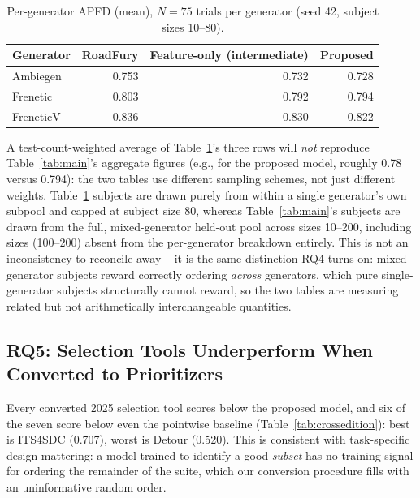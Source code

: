 \documentclass[smallextended]{svjour3}
\begin{document}
\begin{table}[t]
\caption{Per-generator APFD (mean), $N=75$ trials per generator (seed 42,
subject sizes 10--80).}
\label{tab:gen}
\begin{tabular}{lrrr}
\toprule
Generator & RoadFury & Feature-only (intermediate) & Proposed \\
\midrule
Ambiegen & 0.753 & 0.732 & 0.728 \\
Frenetic & 0.803 & 0.792 & 0.794 \\
FreneticV & 0.836 & 0.830 & 0.822 \\
\bottomrule
\end{tabular}
\end{table}

A test-count-weighted average of Table~\ref{tab:gen}'s three rows will
\emph{not} reproduce Table~\ref{tab:main}'s aggregate figures (e.g., for
the proposed model, roughly 0.78 versus 0.794): the two tables use
different sampling schemes, not just different weights. Table~\ref{tab:gen}
subjects are drawn purely from within a single generator's own subpool and
capped at subject size 80, whereas Table~\ref{tab:main}'s subjects are
drawn from the full, mixed-generator held-out pool across sizes 10--200,
including sizes (100--200) absent from the per-generator breakdown
entirely. This is not an inconsistency to reconcile away -- it is the same
distinction RQ4 turns on: mixed-generator subjects reward correctly
ordering \emph{across} generators, which pure single-generator subjects
structurally cannot reward, so the two tables are measuring related but
not arithmetically interchangeable quantities.

\subsection{RQ5: Selection Tools Underperform When Converted to Prioritizers}
\label{sec:rq5}
Every converted 2025 selection tool scores below the proposed model, and
six of the seven score below even the pointwise baseline
(Table~\ref{tab:crossedition}): best is ITS4SDC (0.707), worst is Detour
(0.520). This is consistent with task-specific design mattering: a model
trained to identify a good \emph{subset} has no training signal for
ordering the remainder of the suite, which our conversion procedure fills
with an uninformative random order.
\end{document}
